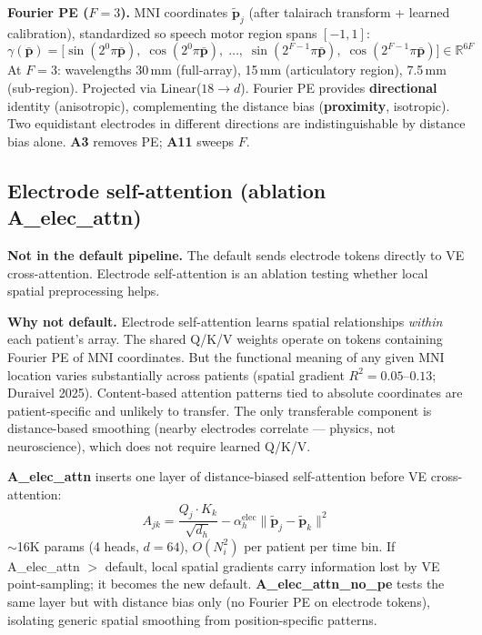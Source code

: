 \documentclass[11pt,letterpaper]{article}
\newcommand{\bfp}{\mathbf{p}}
\newcommand{\R}{\mathbb{R}}
\begin{document}
\textbf{Fourier PE ($F{=}3$).} MNI coordinates $\tilde{\bfp}_j$ (after talairach transform + learned calibration), standardized so speech motor region spans $[-1, 1]$:
\begin{equation}
\gamma(\bar{\bfp}) = \bigl[\sin(2^0 \pi \bar{\bfp}),\; \cos(2^0 \pi \bar{\bfp}),\; \ldots,\; \sin(2^{F-1} \pi \bar{\bfp}),\; \cos(2^{F-1} \pi \bar{\bfp})\bigr] \in \R^{6F}
\end{equation}
At $F{=}3$: wavelengths 30\,mm (full-array), 15\,mm (articulatory region), 7.5\,mm (sub-region). Projected via Linear($18 \to d$). Fourier PE provides \textbf{directional} identity (anisotropic), complementing the distance bias (\textbf{proximity}, isotropic). Two equidistant electrodes in different directions are indistinguishable by distance bias alone. \textbf{A3} removes PE; \textbf{A11} sweeps $F$.


\subsection{Electrode self-attention (ablation A\_elec\_attn)}\label{sec:elec-selfattn}

\textbf{Not in the default pipeline.} The default sends electrode tokens directly to VE cross-attention. Electrode self-attention is an ablation testing whether local spatial preprocessing helps.

\textbf{Why not default.} Electrode self-attention learns spatial relationships \textit{within} each patient's array. The shared Q/K/V weights operate on tokens containing Fourier PE of MNI coordinates. But the functional meaning of any given MNI location varies substantially across patients (spatial gradient $R^2 = 0.05$--$0.13$; Duraivel 2025). Content-based attention patterns tied to absolute coordinates are patient-specific and unlikely to transfer. The only transferable component is distance-based smoothing (nearby electrodes correlate --- physics, not neuroscience), which does not require learned Q/K/V.

\textbf{A\_elec\_attn} inserts one layer of distance-biased self-attention before VE cross-attention:
\begin{equation}
A_{jk} = \frac{Q_j \cdot K_k}{\sqrt{d_h}} - \alpha_h^{\text{elec}} \|\tilde{\bfp}_j - \tilde{\bfp}_k\|^2
\end{equation}
${\sim}$16K params (4 heads, $d{=}64$), $O(N_i^2)$ per patient per time bin. If A\_elec\_attn $>$ default, local spatial gradients carry information lost by VE point-sampling; it becomes the new default. \textbf{A\_elec\_attn\_no\_pe} tests the same layer but with distance bias only (no Fourier PE on electrode tokens), isolating generic spatial smoothing from position-specific patterns.
\end{document}
